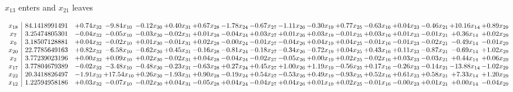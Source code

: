 \documentclass[9pt]{article}
\begin{document}
 $ x_{13} $ enters and $ x_{21} $ leaves 

 \[\begin{array}{c| c c@{\hskip 2pt} c@{\hskip 2pt} c@{\hskip 2pt} c@{\hskip 2pt} c@{\hskip 2pt} c@{\hskip 2pt} c@{\hskip 2pt} c@{\hskip 2pt} c@{\hskip 2pt} c@{\hskip 2pt} c@{\hskip 2pt} c@{\hskip 2pt} c@{\hskip 2pt} c@{\hskip 2pt} c@{\hskip 2pt} }
 x_{18}   &  84.1418991491 & +  0.74 x_{32} & -9.84 x_{10} & -0.12 x_{30} & +  0.40 x_{31} & +  0.67 x_{28} & -1.78 x_{24} & -0.67 x_{27} & -1.11 x_{26} & -0.30 x_{19} & +  0.77 x_{25} & -0.63 x_{16} & +  0.04 x_{23} & -0.46 x_{21} & + 10.16 x_{14} & +  0.89 x_{29}\\
 x_{7}   &  3.25474805301 & -0.04 x_{32} & -0.05 x_{10} & -0.03 x_{30} & -0.02 x_{31} & +  0.01 x_{28} & -0.04 x_{24} & +  0.03 x_{27} & +  0.01 x_{26} & +  0.03 x_{19} & -0.01 x_{25} & +  0.03 x_{16} & +  0.01 x_{23} & -0.01 x_{21} & +  0.36 x_{14} & +  0.02 x_{29}\\
 x_{9}   &  3.18507128881 & +  0.04 x_{32} & -0.02 x_{10} & +  0.01 x_{30} & -0.01 x_{31} & +  0.02 x_{28} & -0.00 x_{24} & -0.01 x_{27} & -0.04 x_{26} & +  0.04 x_{19} & +  0.04 x_{25} & -0.01 x_{16} & -0.01 x_{23} & -0.02 x_{21} & -0.49 x_{14} & -0.01 x_{29}\\
 x_{20}   &  22.7785649163 & +  0.82 x_{32} & -6.58 x_{10} & -0.62 x_{30} & +  0.45 x_{31} & -0.16 x_{28} & -0.81 x_{24} & -0.18 x_{27} & -0.34 x_{26} & -0.72 x_{19} & +  0.04 x_{25} & +  0.43 x_{16} & +  0.11 x_{23} & -0.87 x_{21} & -0.69 x_{14} & +  1.02 x_{29}\\
 x_{2}   &  3.77239023196 & +  0.00 x_{32} & +  0.09 x_{10} & +  0.02 x_{30} & -0.02 x_{31} & +  0.04 x_{28} & -0.04 x_{24} & -0.02 x_{27} & -0.05 x_{26} & +  0.00 x_{19} & +  0.02 x_{25} & -0.02 x_{16} & +  0.03 x_{23} & -0.03 x_{21} & +  0.44 x_{14} & +  0.06 x_{29}\\
 x_{17}   &  3.77804679389 & -0.02 x_{32} & -3.48 x_{10} & -0.48 x_{30} & -0.23 x_{31} & -0.63 x_{28} & +  0.27 x_{24} & +  0.45 x_{27} & +  1.00 x_{26} & +  1.19 x_{19} & -0.56 x_{25} & +  0.17 x_{16} & -0.26 x_{23} & -0.14 x_{21} & -13.88 x_{14} & -1.02 x_{29}\\
 x_{22}   &  20.3418826497 & -1.91 x_{32} & + 17.54 x_{10} & +  0.26 x_{30} & -1.93 x_{31} & +  0.90 x_{28} & -0.19 x_{24} & +  0.54 x_{27} & -0.53 x_{26} & +  0.49 x_{19} & -0.93 x_{25} & +  0.52 x_{16} & +  0.61 x_{23} & +  0.58 x_{21} & +  7.33 x_{14} & +  1.20 x_{29}\\
 x_{12}   &  1.22594958186 & +  0.03 x_{32} & -0.07 x_{10} & -0.02 x_{30} & +  0.04 x_{31} & -0.05 x_{28} & +  0.04 x_{24} & -0.04 x_{27} & +  0.04 x_{26} & +  0.01 x_{19} & +  0.02 x_{25} & -0.01 x_{16} & -0.00 x_{23} & +  0.01 x_{21} & +  0.00 x_{14} & -0.04 x_{29}\\

\end{array}\]
\end{document}
